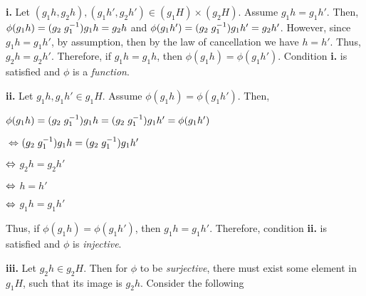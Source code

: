 \documentclass[12pt, a4paper]{article}
\begin{document}
\vspace{6mm}


\textbf{i. }Let $(g_1 h, g_2 h),(g_1 h', g_2 h')\in (g_1 H)\times(g_2 H)$. Assume $g_1 h=g_1 h'$. Then, $\phi(g_1 h)=(g_2\hspace{1mm} g^{-1}_1)g_1 h=g_2 h$ and $\phi(g_1 h')=(g_2\hspace{1mm} g^{-1}_1)g_1 h'=g_2 h'$. However, since $g_1 h=g_1 h'$, by assumption, then by the law of cancellation we have $h=h'$. Thus, $g_2 h=g_2 h'$. Therefore, if $g_1 h=g_1 h$, then $\phi(g_1 h)=\phi(g_1 h')$. Condition \textbf{i.} is satisfied and $\phi$ is a \textit{function}.

\vspace{6mm}

\textbf{ii. }Let $g_1 h,g_1 h'\in g_1 H$. Assume $\phi(g_1 h)=\phi(g_1 h')$. Then,


\vspace{4mm}

\centerline{$\phi(g_1 h)=(g_2\hspace{1mm} g^{-1}_1)g_1 h=(g_2\hspace{1mm} g^{-1}_1)g_1 h'=\phi(g_1 h')$}

\begin{description}
\item{$\Leftrightarrow$\hspace{1mm}}$(g_2\hspace{1mm} g^{-1}_1)g_1 h=(g_2\hspace{1mm} g^{-1}_1)g_1 h'$
\item{$\Leftrightarrow\hspace{1mm}$}$g_2 h=g_2 h'$
\item{$\Leftrightarrow\hspace{1mm}$}$h=h'$
\item{$\Leftrightarrow\hspace{1mm}$}$g_1 h=g_1 h'$\par
\end{description}


Thus, if $\phi(g_1 h)=\phi(g_1 h')$, then $g_1 h=g_1 h'$. Therefore, condition \textbf{ii.} is satisfied and $\phi$ is \textit{injective}.

\vspace{2mm}

\begin{flushleft}
\textbf{iii. }Let $g_2 h\in g_2 H$. Then for $\phi$ to be \textit{surjective}, there must exist some element in $g_1 H$, such that its image is $g_2 h$. Consider the following
\end{flushleft}
\end{document}
